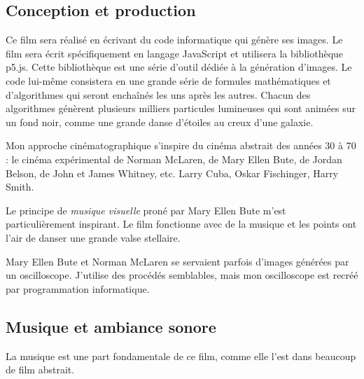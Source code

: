 {%

%


\subsection{Conception et production}
Ce film sera réalisé en écrivant du code informatique qui génère ses images. Le film sera écrit spécifiquement en langage JavaScript et utilisera la bibliothèque p5.js. Cette bibliothèque est une série d'outil dédiée à la génération d'images. Le code lui-même consistera en une grande série de formules mathématiques et d'algorithmes qui seront enchaînés les uns après les autres. Chacun des algorithmes génèrent plusieurs milliers particules lumineuses qui sont animées sur un fond noir, comme une grande danse d'étoiles au creux d'une galaxie. 

Mon approche cinématographique s'inspire du cinéma abstrait des années 30 à 70 : le cinéma expérimental de Norman McLaren, de Mary Ellen Bute, de Jordan Belson, de John et James Whitney, etc. Larry Cuba, Oskar Fischinger, Harry Smith.

Le principe de \textit{musique visuelle} proné par Mary Ellen Bute m'est particulièrement inspirant. Le film fonctionne avec de la musique et les points ont l'air de danser une grande valse stellaire.

Mary Ellen Bute et Norman McLaren se servaient parfois d'images générées par un oscilloscope. J'utilise des procédés semblables, mais mon oscilloscope est recréé par programmation informatique.

\subsection {Musique et ambiance sonore}
La musique est une part fondamentale de ce film, comme elle l'est dans beaucoup de film abstrait.

}
